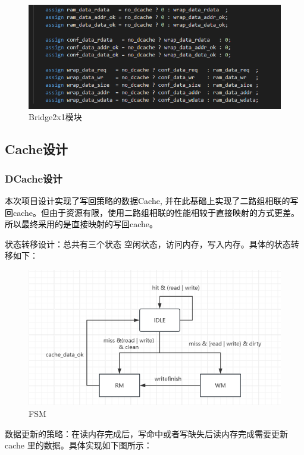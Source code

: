 \begin{figure}
\centering
\includegraphics[width=0.5\linewidth]{image/p13.png}
\caption{Bridge2x1模块}
\label{fig:enter-label}
\end{figure}
\begin{flushleft}

\newpage
\subsection{ Cache设计}
\subsubsection{DCache设计}
\textcolor{black}{本次项目设计实现了写回策略的数据Cache, 并在此基础上实现了二路组相联的写回cache。但由于资源有限，使用二路组相联的性能相较于直接映射的方式更差。所以最终采用的是直接映射的写回cache。}
\item 状态转移设计：总共有三个状态 空闲状态，访问内存，写入内存。具体的状态转移如下：

\begin{figure}[htbp]
    \centering
    \includegraphics[width=\textwidth]{image/FSM.png}
    \caption{FSM}
\end{figure}

\item 数据更新的策略：在读内存完成后，写命中或者写缺失后读内存完成需要更新 cache 里的数据。具体实现如下图所示：


\end{flushleft}
